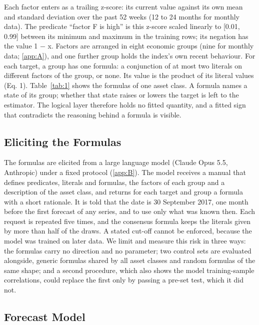 \documentclass[review]{elsarticle}
\begin{document}
Each factor enters as a trailing z-score: its current value against its own mean and standard deviation over the past 52 weeks (12 to 24 months for monthly data). The predicate ``factor F is high'' is this z-score scaled linearly to [0.01, 0.99] between its minimum and maximum in the training rows; its negation has the value 1 \ensuremath{-} x. Factors are arranged in eight economic groups (nine for monthly data; \ref{app:A}), and one further group holds the index's own recent behaviour. For each target, a group has one formula: a conjunction of at most two literals on different factors of the group, or none. Its value is the product of its literal values (Eq. 1). Table~\ref{tab:1} shows the formulas of one asset class. A formula names a state of its group; whether that state raises or lowers the target is left to the estimator. The logical layer therefore holds no fitted quantity, and a fitted sign that contradicts the reasoning behind a formula is visible.



\subsection{Eliciting the Formulas}\label{sec:4.2}

The formulas are elicited from a large language model (Claude Opus 5.5, Anthropic) under a fixed protocol (\ref{app:B}). The model receives a manual that defines predicates, literals and formulas, the factors of each group and a description of the asset class, and returns for each target and group a formula with a short rationale. It is told that the date is 30 September 2017, one month before the first forecast of any series, and to use only what was known then. Each request is repeated five times, and the consensus formula keeps the literals given by more than half of the draws. A stated cut-off cannot be enforced, because the model was trained on later data. We limit and measure this risk in three ways: the formulas carry no direction and no parameter; two control sets are evaluated alongside, generic formulas shared by all asset classes and random formulas of the same shape; and a second procedure, which also shows the model training-sample correlations, could replace the first only by passing a pre-set test, which it did not.

\subsection{Forecast Model}\label{sec:4.3}
\end{document}
